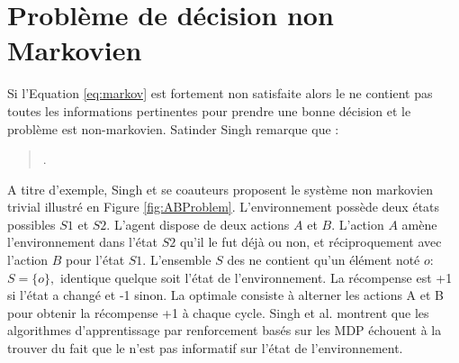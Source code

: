 


\section{Problème de décision non Markovien}
\label{sec:NMDP}

\noindent
Si l'Equation \eqref{eq:markov} est fortement non satisfaite alors le  ne contient pas toutes les informations pertinentes pour prendre une bonne décision et le problème est non-markovien. 
Satinder Singh remarque que :

\begin{quote}
	\cite[p.~284]{singh_learning_1994}.
\end{quote}

A titre d'exemple, Singh et se coauteurs proposent le système non markovien trivial illustré en Figure \ref{fig:ABProblem}. 
L'environnement possède deux états possibles $S1$ et $S2$. 
L'agent dispose de deux actions $A$ et $B$. 
L'action $A$ amène l'environnement dans l'état $S2$ qu'il le fut déjà ou non, et réciproquement avec l'action $B$ pour l'état $S1$.
L'ensemble $S$ des  ne contient qu'un élément noté $o$: $S = \{o\}, $
identique quelque soit l'état de l'environnement. 
La récompense est +1 si l'état a changé et -1 sinon.
La  optimale consiste à alterner les actions A et B pour obtenir la récompense +1 à chaque cycle.
Singh et al. montrent que les algorithmes d'apprentissage par renforcement basés sur les MDP échouent à la trouver du fait que le  n'est pas informatif sur l'état de l'environnement.

